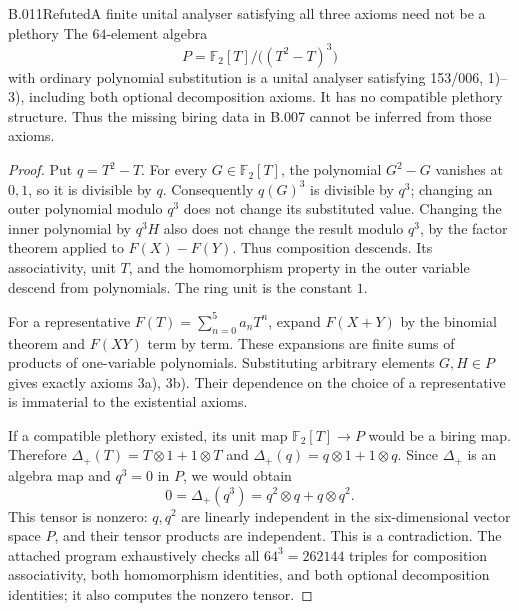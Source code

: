 \begin{saresult}{B.011}{Refuted}{A finite unital analyser satisfying all three axioms need not be a plethory}
The $64$-element algebra
\[
 P=\mathbb F_2[T]/\bigl((T^2-T)^3\bigr)
\]
with ordinary polynomial substitution is a unital analyser
satisfying 153/006, 1)--3), including both optional decomposition
axioms. It has no compatible plethory structure. Thus the missing
biring data in B.007 cannot be inferred from those axioms.
\end{saresult}
\begin{proof}
Put $q=T^2-T$. For every $G\in\mathbb F_2[T]$, the polynomial
$G^2-G$ vanishes at $0,1$, so it is divisible by $q$.
Consequently $q(G)^3$ is divisible by $q^3$; changing an outer
polynomial modulo $q^3$ does not change its substituted value.
Changing the inner polynomial by $q^3H$ also does not change the
result modulo $q^3$, by the factor theorem applied to
$F(X)-F(Y)$. Thus composition descends. Its associativity, unit
$T$, and the homomorphism property in the outer variable descend
from polynomials. The ring unit is the constant $1$.

For a representative $F(T)=\sum_{n=0}^5 a_nT^n$, expand
$F(X+Y)$ by the binomial theorem and $F(XY)$ term by term.
These expansions are finite sums of products of one-variable
polynomials. Substituting arbitrary elements $G,H\in P$ gives
exactly axioms 3a), 3b). Their dependence on the choice of a
representative is immaterial to the existential axioms.

If a compatible plethory existed, its unit map
$\mathbb F_2[T]\longrightarrow P$ would be a biring map.
Therefore $\Delta_+(T)=T\otimes1+1\otimes T$ and
$\Delta_+(q)=q\otimes1+1\otimes q$. Since $\Delta_+$ is an
algebra map and $q^3=0$ in $P$, we would obtain
\[
 0=\Delta_+(q^3)=q^2\otimes q+q\otimes q^2.
\]
This tensor is nonzero: $q,q^2$ are linearly independent in the
six-dimensional vector space $P$, and their tensor products are
independent. This is a contradiction. The attached program
exhaustively checks all $64^3=262144$ triples for composition
associativity, both homomorphism identities, and both optional
decomposition identities; it also computes the nonzero tensor.
\end{proof}

